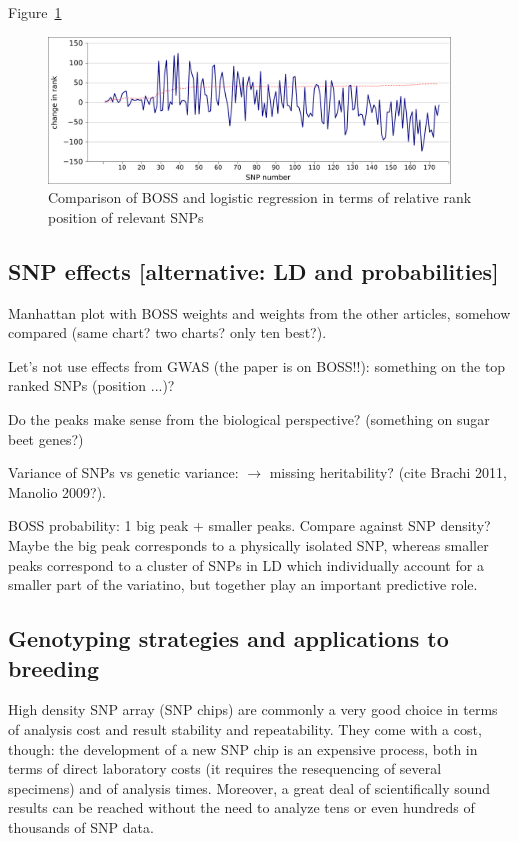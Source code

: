 Figure~\ref{fig:rank}

\begin{figure}
\includegraphics[width=0.95\textwidth]{rank.pdf}
\caption{Comparison of BOSS and logistic regression in terms of relative
rank position of relevant SNPs}
\label{fig:rank} 
\end{figure}


\subsection{SNP effects [alternative: LD and probabilities]}
Manhattan plot with BOSS weights and weights from the other articles,
somehow compared (same chart? two charts? only ten best?).

Let's not use effects from GWAS (the paper is on BOSS!!): something on
the top ranked SNPs (position ...)?

Do the peaks make sense from the biological perspective? (something on
sugar beet genes?)

Variance of SNPs vs genetic variance: $\rightarrow$ missing
heritability? (cite Brachi 2011, Manolio 2009?).

BOSS probability: 1 big peak + smaller peaks. Compare against SNP
density? Maybe the big peak corresponds to a physically isolated SNP,
whereas smaller peaks correspond to a cluster of SNPs in LD which
individually account for a smaller part of the variatino, but together
play an important predictive role. 


\subsection{Genotyping strategies and applications to breeding}
High density SNP array (SNP chips) are commonly a very good choice in
terms of analysis cost and result stability and repeatability. They come
with a cost, though: the development of a new SNP chip is an expensive
process, both in terms of direct laboratory costs (it requires the
resequencing of several specimens) and of analysis times. Moreover, a great deal
of scientifically sound results can be reached without the need to analyze
tens or even hundreds of thousands of SNP data.

